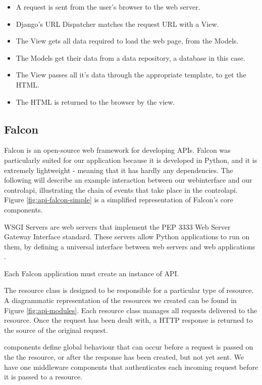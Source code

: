 \begin{itemize}
\item A request is sent from the user's browser to the web server.
\item Django's URL Dispatcher matches the request URL with a View.
\item The View gets all data required to load the web page, from the Models.
\item The Models get their data from a data repository, a database in this case.
\item The View passes all it's data through the appropriate template, to get the HTML.
\item The HTML is returned to the browser by the view.
\end{itemize}

\subsection{Falcon}

Falcon is an open-source web framework for developing \glspl{API}. Falcon was particularly suited for our application because it is developed in Python, and it is extremely lightweight - meaning that it has hardly any dependencies.
\newline
The following will describe an example interaction between our \gls{webinterface} and our \gls{controlapi}, illustrating the chain of events that take place in the \gls{controlapi}.
\newline
Figure \ref{fig:api-falcon-simple} is a simplified representation of Falcon's core components. 

\begin{description}
\item{WSGI Servers} are web servers that implement the PEP 3333 Web Server Gateway Interface standard. These servers allow Python applications to run on them, by defining a universal interface between web servers and web applications \cite{pep-3333}.

\item [Application] Each Falcon application must create an instance of API. 

\item [Resource] The resource class is designed to be responsible for a particular type of resource. A diagrammatic representation of the resources we created can be found in Figure \ref{fig:api-modules}. Each resource class manages all requests delivered to the resource. Once the request has been dealt with, a HTTP response is returned to the source of the original request.

\item [Middleware] components define global behaviour that can occur before a request is passed on the the resource, or after the response has been created, but not yet sent. We have one middleware components that authenticates each incoming request before it is passed to a resource.
\end{description}

